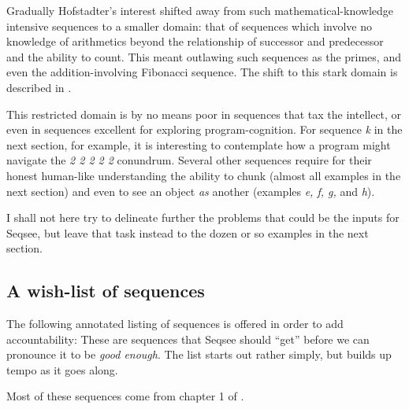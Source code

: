 \documentclass[letterpaper]{article}
\begin{document}
Gradually Hofstadter's interest shifted away from such mathematical-knowledge intensive sequences to a smaller domain: that of sequences which involve no knowledge of arithmetics beyond the relationship of successor and predecessor and the ability to count. This meant outlawing such sequences as the primes, and even the addition-involving Fibonacci sequence. The shift to this stark domain is described in .

This restricted domain is by no means poor in sequences that tax the intellect, or even in sequences excellent for exploring program-cognition. For sequence \emph{k} in the next section, for example, it is interesting to contemplate how a program might navigate the \emph{2 2 2 2 2} conundrum. Several other sequences require for their honest human-like understanding the ability to chunk (almost all examples in the next section) and even to see an object \emph{as} another (examples \emph{e, f, g, } and \emph{h}).

I shall not here try to delineate further the problems that could be the inputs for Seqsee, but leave that task instead to the dozen or so examples in the next section.

\subsection{A wish-list of sequences}
\label{sec:list}

The following annotated listing of sequences is offered in order to add accountability: These are sequences that Seqsee should ``get'' before we can pronounce it to be \emph{good enough}. The list starts out rather simply, but builds up tempo as it goes along.

Most of these sequences come from chapter 1 of .
\end{document}
